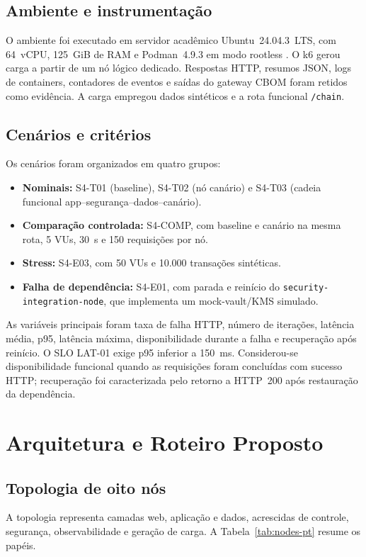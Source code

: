 \documentclass[12pt]{article}
\begin{document}
\subsection{Ambiente e instrumenta\c{c}\~ao}
O ambiente foi executado em servidor acad\^emico Ubuntu~24.04.3~LTS, com 64~vCPU, 125~GiB de RAM e Podman~4.9.3 em modo rootless \cite{podman}. O k6 gerou carga a partir de um n\'o l\'ogico dedicado. Respostas HTTP, resumos JSON, logs de containers, contadores de eventos e sa\'idas do gateway CBOM foram retidos como evid\^encia. A carga empregou dados sint\'eticos e a rota funcional \texttt{/chain}.

\subsection{Cen\'arios e crit\'erios}
Os cen\'arios foram organizados em quatro grupos:
\begin{itemize}
\item \textbf{Nominais:} S4-T01 (baseline), S4-T02 (n\'o can\'ario) e S4-T03 (cadeia funcional app--seguran\c{c}a--dados--can\'ario).
\item \textbf{Compara\c{c}\~ao controlada:} S4-COMP, com baseline e can\'ario na mesma rota, 5 VUs, 30~s e 150 requisi\c{c}\~oes por n\'o.
\item \textbf{Stress:} S4-E03, com 50 VUs e 10.000 transa\c{c}\~oes sint\'eticas.
\item \textbf{Falha de depend\^encia:} S4-E01, com parada e rein\'icio do \texttt{security-integration-node}, que implementa um mock-vault/KMS simulado.
\end{itemize}

As vari\'aveis principais foram taxa de falha HTTP, n\'umero de itera\c{c}\~oes, lat\^encia m\'edia, p95, lat\^encia m\'axima, disponibilidade durante a falha e recupera\c{c}\~ao ap\'os rein\'icio. O SLO LAT-01 exige p95 inferior a 150~ms. Considerou-se disponibilidade funcional quando as requisi\c{c}\~oes foram conclu\'idas com sucesso HTTP; recupera\c{c}\~ao foi caracterizada pelo retorno a HTTP~200 ap\'os restaura\c{c}\~ao da depend\^encia.

\section{Arquitetura e Roteiro Proposto}
\subsection{Topologia de oito n\'os}
A topologia representa camadas web, aplica\c{c}\~ao e dados, acrescidas de controle, seguran\c{c}a, observabilidade e gera\c{c}\~ao de carga. A Tabela~\ref{tab:nodes-pt} resume os pap\'eis.
\end{document}
